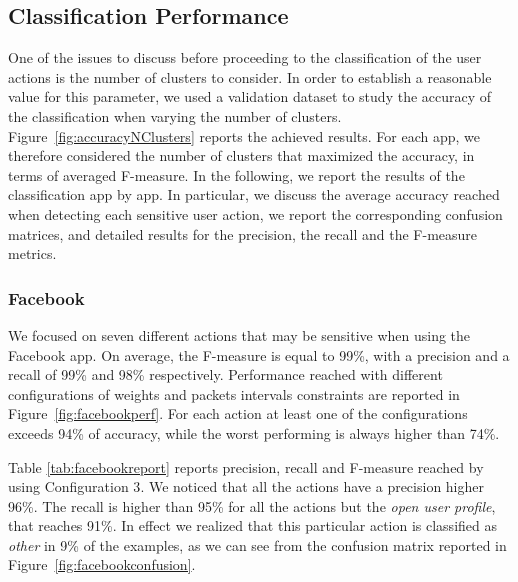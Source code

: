 \documentclass{acm_proc_article-sp}
\newcommand{\hilight}[1]{#1}
\begin{document}
  
 
 
  



 
  




\subsection{Classification Performance}\label{ClassificationPerformances}  

One of the issues to discuss before proceeding to the classification of the user actions
is \hilight{the number of clusters to consider.} In order to establish a reasonable value for this parameter, we used a validation dataset
to study the accuracy of the classification when varying the number of clusters. Figure~\ref{fig:accuracyNClusters}
reports the achieved results. For each app, we therefore considered
the number of clusters that maximized the accuracy, in terms of averaged F-measure. In the following, we report the 
results of the classification app by app. 
In particular, we discuss the average accuracy reached 
when detecting each sensitive user action, we report the corresponding confusion matrices, and 
detailed results for the precision, the recall and the F-measure metrics. 






\subsubsection{Facebook}
  \label{ClassPerf:Facebook}

We focused on seven different actions that may be sensitive when using the 
Facebook app. On average, the F-measure is equal 
to 99\%, with a precision and a recall of 99\% and 98\% respectively. 
Performance reached with different configurations of weights and packets intervals 
constraints are reported in Figure~\ref{fig:facebookperf}. 
For each action at least one of the configurations exceeds 94\% of 
accuracy, while the 
worst performing is always higher than 74\%. 

Table \ref{tab:facebookreport} reports precision, recall and F-measure reached 
by using {Configuration 3}. We noticed that all the actions have a precision higher 
96\%. The recall is higher than 95\% for all the actions but the \emph{open user profile}, that reaches 91\%. 
In effect we realized that this particular action is 
classified as \emph{other} in 9\% of the examples, as we can see from the confusion matrix 
reported in Figure~\ref{fig:facebookconfusion}. 
\end{document}
